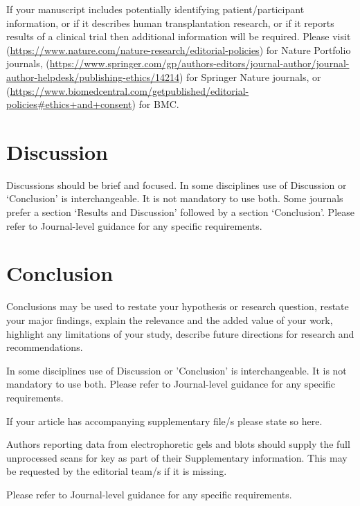 \documentclass[sn-mathphys]{sn-jnl}%
\theoremstyle{thmstyleone}%
\theoremstyle{thmstyletwo}%
\theoremstyle{thmstylethree}%
\begin{document}
If your manuscript includes potentially identifying patient/participant information, or if it describes human transplantation research, or if it reports results of a clinical trial then  additional information will be required. Please visit (\url{https://www.nature.com/nature-research/editorial-policies}) for Nature Portfolio journals, (\url{https://www.springer.com/gp/authors-editors/journal-author/journal-author-helpdesk/publishing-ethics/14214}) for Springer Nature journals, or (\url{https://www.biomedcentral.com/getpublished/editorial-policies\#ethics+and+consent}) for BMC.

\section{Discussion}\label{sec12}

Discussions should be brief and focused. In some disciplines use of Discussion or `Conclusion' is interchangeable. It is not mandatory to use both. Some journals prefer a section `Results and Discussion' followed by a section `Conclusion'. Please refer to Journal-level guidance for any specific requirements. 

\section{Conclusion}\label{sec13}

Conclusions may be used to restate your hypothesis or research question, restate your major findings, explain the relevance and the added value of your work, highlight any limitations of your study, describe future directions for research and recommendations. 

In some disciplines use of Discussion or 'Conclusion' is interchangeable. It is not mandatory to use both. Please refer to Journal-level guidance for any specific requirements. 

\backmatter


If your article has accompanying supplementary file/s please state so here. 

Authors reporting data from electrophoretic gels and blots should supply the full unprocessed scans for key as part of their Supplementary information. This may be requested by the editorial team/s if it is missing.

Please refer to Journal-level guidance for any specific requirements.

\end{document}

